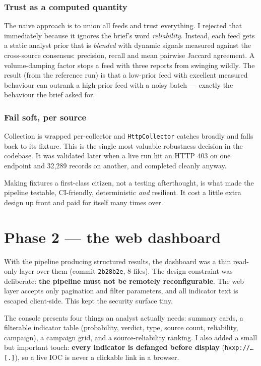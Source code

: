 \documentclass[11pt,a4paper]{article}
\newcommand{\code}[1]{\texttt{\small #1}}
\begin{document}
\subsubsection{Trust as a computed quantity}
The naive approach is to union all feeds and trust everything. I rejected that
immediately because it ignores the brief's word \emph{reliability}. Instead,
each feed gets a static analyst prior that is \emph{blended} with dynamic
signals measured against the cross-source consensus: precision, recall and mean
pairwise Jaccard agreement. A volume-damping factor stops a feed with three
reports from swinging wildly. The result (from the reference run) is that a
low-prior feed with excellent measured behaviour can outrank a high-prior feed
with a noisy batch --- exactly the behaviour the brief asked for.

\subsubsection{Fail soft, per source}
Collection is wrapped per-collector and \code{HttpCollector} catches broadly and
falls back to its fixture. This is the single most valuable robustness decision
in the codebase. It was validated later when a live run hit an HTTP 403 on one
endpoint and 32{,}289 records on another, and completed cleanly anyway.

\begin{lessonbox}
Making fixtures a first-class citizen, not a testing afterthought, is what made
the pipeline testable, CI-friendly, deterministic \emph{and} resilient. It cost
a little extra design up front and paid for itself many times over.
\end{lessonbox}

\section{Phase 2 --- the web dashboard}

With the pipeline producing structured results, the dashboard was a thin
read-only layer over them (commit \texttt{2b28b2e}, 8 files). The design
constraint was deliberate: \textbf{the pipeline must not be remotely
reconfigurable}. The web layer accepts only pagination and filter parameters,
and all indicator text is escaped client-side. This kept the security surface
tiny.

The console presents four things an analyst actually needs: summary cards, a
filterable indicator table (probability, verdict, type, source count,
reliability, campaign), a campaign grid, and a source-reliability ranking. I
also added a small but important touch: \textbf{every indicator is defanged
before display} (\code{hxxp://\dots[.]}), so a live IOC is never a clickable
link in a browser.
\end{document}
